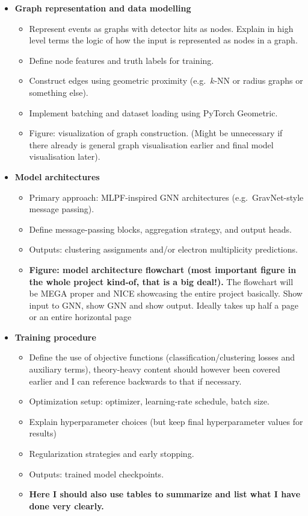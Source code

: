 \begin{itemize}
\item \textbf{Graph representation and data modelling}
\begin{itemize}
    \item Represent events as graphs with detector hits as nodes. Explain in high level terms the logic of how the input is represented as nodes in a graph. 
    \item Define node features and truth labels for training. 
    \item Construct edges using geometric proximity (e.g.\ $k$-NN or radius graphs or something else). 
    \item Implement batching and dataset loading using PyTorch Geometric.
    \item Figure: visualization of graph construction. (Might be unnecessary if there already is general graph visualisation earlier and final model visualisation later). 
\end{itemize}

\item \textbf{Model architectures}
\begin{itemize}
    \item Primary approach: MLPF-inspired GNN architectures (e.g.\ GravNet-style message passing).
    \item Define message-passing blocks, aggregation strategy, and output heads.
    \item Outputs: clustering assignments and/or electron multiplicity predictions.
    \item \textbf{Figure: model architecture flowchart (most important figure in the whole project kind-of, that is a big deal!).} The flowchart will be MEGA proper and NICE showcasing the entire project basically. Show input to GNN, show GNN and show output. Ideally takes up half a page or an entire horizontal page
\end{itemize}

\item \textbf{Training procedure}
\begin{itemize}
    \item Define the use of objective functions (classification/clustering losses and auxiliary terms), theory-heavy content should however been covered earlier and I can reference backwards to that if necessary. 
    \item Optimization setup: optimizer, learning-rate schedule, batch size.
    \item Explain hyperparameter choices (but keep final hyperparameter values for results) 
    \item Regularization strategies and early stopping.
    \item Outputs: trained model checkpoints.
    \item \textbf{Here I should also use tables to summarize and list what I have done very clearly.}
\end{itemize}


\end{itemize}
